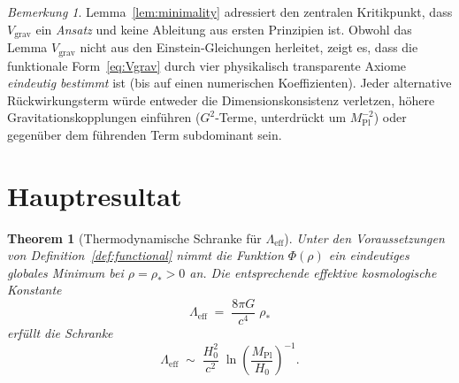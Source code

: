 \documentclass[12pt,a4paper]{article}
\theoremstyle{definition}
\theoremstyle{plain}
\newtheorem{theorem}[definition]{Theorem}
\theoremstyle{remark}
\newtheorem{remark}[definition]{Bemerkung}
\newcommand{\Leff}{\Lambda_{\mathrm{eff}}}
\begin{document}
\begin{remark}
Lemma~\ref{lem:minimality} adressiert den zentralen Kritikpunkt, dass $V_{\mathrm{grav}}$ ein \emph{Ansatz} und keine Ableitung aus ersten Prinzipien ist. Obwohl das Lemma $V_{\mathrm{grav}}$ nicht aus den Einstein-Gleichungen herleitet, zeigt es, dass die funktionale Form~\eqref{eq:Vgrav} durch vier physikalisch transparente Axiome \emph{eindeutig bestimmt} ist (bis auf einen numerischen Koeffizienten). Jeder alternative R\"uckwirkungsterm w\"urde entweder die Dimensionskonsistenz verletzen, h\"ohere Gravitationskopplungen einf\"uhren ($G^2$-Terme, unterdr\"uckt um $M_{\mathrm{Pl}}^{-2}$) oder gegen\"uber dem f\"uhrenden Term subdominant sein.
\end{remark}

\section{Hauptresultat}\label{sec:main}

\begin{theorem}[Thermodynamische Schranke f\"ur $\Leff$]\label{thm:main}
Unter den Voraussetzungen von Definition~\ref{def:functional} nimmt die
Funktion $\Phi(\rho)$ ein eindeutiges globales Minimum bei
$\rho = \rho_{\ast} > 0$ an. Die entsprechende effektive kosmologische
Konstante
\begin{equation}\label{eq:Leff}
  \Leff \;=\; \frac{8\pi G}{c^{4}}\;\rho_{\ast}
\end{equation}
erf\"ullt die Schranke
\begin{equation}\label{eq:bound}
  \Leff \;\sim\;
  \frac{H_0^{2}}{c^{2}}\;
  \ln\!\left(\frac{M_{\mathrm{Pl}}}{H_0}\right)^{-1}.
\end{equation}
\end{theorem}
\end{document}
